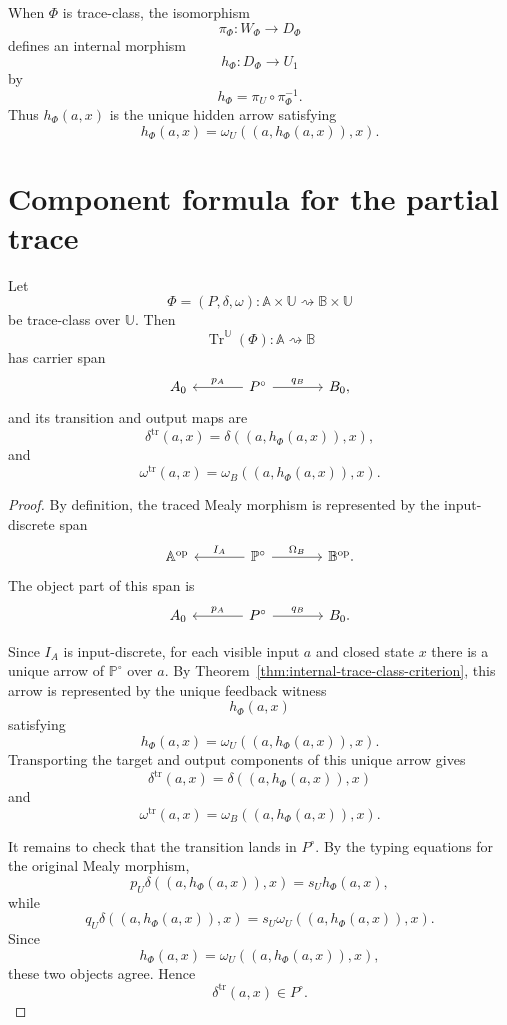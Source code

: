 When \(\Phi\) is trace-class, the isomorphism
\[
\pi_\Phi:W_\Phi\to D_\Phi
\]
defines an internal morphism
\[
h_\Phi:D_\Phi\to U_1
\]
by
\[
h_\Phi=\pi_U\circ\pi_\Phi^{-1}.
\]
Thus \(h_\Phi(a,x)\) is the unique hidden arrow satisfying
\[
h_\Phi(a,x)=\omega_U((a,h_\Phi(a,x)),x).
\]

\section{Component formula for the partial trace}
\label{sec:component-formula-partial-trace}

\begin{proposition}
\label{prop:component-formula-partial-trace}
Let
\[
\Phi=(P,\delta,\omega):
\mathbb A\times\mathbb U
\rightsquigarrow
\mathbb B\times\mathbb U
\]
be trace-class over \(\mathbb U\).  Then
\[
\operatorname{Tr}^{\mathbb U}(\Phi):
\mathbb A\rightsquigarrow\mathbb B
\]
has carrier span
\[
\begin{tikzcd}[column sep=large]
A_0
&
P^\circ
  \arrow[l, "p_A"']
  \arrow[r, "q_B"]
&
B_0,
\end{tikzcd}
\]
and its transition and output maps are
\[
\delta^{\operatorname{tr}}(a,x)
=
\delta((a,h_\Phi(a,x)),x),
\]
and
\[
\omega^{\operatorname{tr}}(a,x)
=
\omega_B((a,h_\Phi(a,x)),x).
\]
\end{proposition}

\begin{proof}
By definition, the traced Mealy morphism is represented by the input-discrete
span
\[
\begin{tikzcd}[column sep=large]
\mathbb A^{\mathrm{op}}
&
\mathbb P^\circ
  \arrow[l, "I_A"']
  \arrow[r, "\Omega_B"]
&
\mathbb B^{\mathrm{op}} .
\end{tikzcd}
\]
The object part of this span is
\[
\begin{tikzcd}[column sep=large]
A_0
&
P^\circ
  \arrow[l, "p_A"']
  \arrow[r, "q_B"]
&
B_0.
\end{tikzcd}
\]

Since \(I_A\) is input-discrete, for each visible input \(a\) and closed state
\(x\) there is a unique arrow of \(\mathbb P^\circ\) over \(a\).  By
Theorem~\ref{thm:internal-trace-class-criterion}, this arrow is represented by
the unique feedback witness
\[
h_\Phi(a,x)
\]
satisfying
\[
h_\Phi(a,x)=\omega_U((a,h_\Phi(a,x)),x).
\]
Transporting the target and output components of this unique arrow gives
\[
\delta^{\operatorname{tr}}(a,x)
=
\delta((a,h_\Phi(a,x)),x)
\]
and
\[
\omega^{\operatorname{tr}}(a,x)
=
\omega_B((a,h_\Phi(a,x)),x).
\]

It remains to check that the transition lands in \(P^\circ\).  By the typing
equations for the original Mealy morphism,
\[
p_U\delta((a,h_\Phi(a,x)),x)
=
s_Uh_\Phi(a,x),
\]
while
\[
q_U\delta((a,h_\Phi(a,x)),x)
=
s_U\omega_U((a,h_\Phi(a,x)),x).
\]
Since
\[
h_\Phi(a,x)=\omega_U((a,h_\Phi(a,x)),x),
\]
these two objects agree.  Hence
\[
\delta^{\operatorname{tr}}(a,x)\in P^\circ.
\]
\end{proof}


